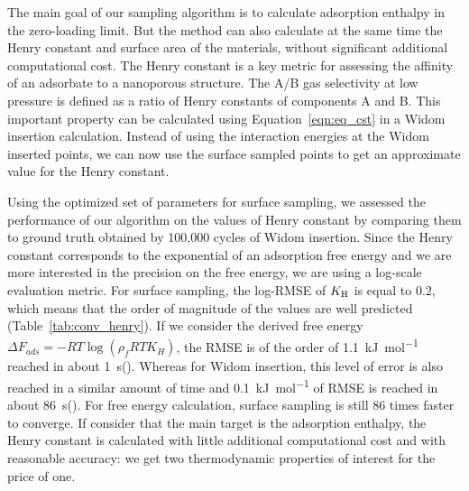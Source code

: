 \documentclass[main]{subfiles}
\begin{document}
The main goal of our sampling algorithm is to calculate adsorption enthalpy in the zero-loading limit. But the method can also calculate at the same time the Henry constant and surface area of the materials, without significant additional computational cost. The Henry constant is a key metric for assessing the affinity of an adsorbate to a nanoporous structure. The A/B gas selectivity at low pressure is defined as a ratio of Henry constants of components A and B. This important property can be calculated using Equation~\ref{eqn:eq_cst} in a Widom insertion calculation. Instead of using the interaction energies at the Widom inserted points, we can now use the surface sampled points to get an approximate value for the Henry constant.

Using the optimized set of parameters for surface sampling, we assessed the performance of our algorithm on the values of Henry constant by comparing them to ground truth obtained by 100,000 cycles of Widom insertion. Since the Henry constant corresponds to the exponential of an adsorption free energy and we are more interested in the precision on the free energy, we are using a log-scale evaluation metric. For surface sampling, the log-RMSE of $K_{\text{H}}$ is equal to $0.2$, which means that the order of magnitude of the values are well predicted (Table~\ref{tab:conv_henry}). If we consider the derived free energy $\Delta F_{ads} = -RT \log(\rho_fRT K_H)$, the RMSE is of the order of \SI{1.1}{\kilo\joule\per\mole} reached in about \SI{1}{\second}(). Whereas for Widom insertion, this level of error is also reached in a similar amount of time and \SI{0.1}{\kilo\joule\per\mole} of RMSE is reached in about \SI{86}{\second}(). For free energy calculation, surface sampling is still 86 times faster to converge. If consider that the main target is the adsorption enthalpy, the Henry constant is calculated with little additional computational cost and with reasonable accuracy: we get two thermodynamic properties of interest for the price of one.
\end{document}
